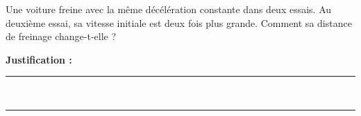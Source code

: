Une voiture freine avec la même décélération constante dans deux essais. Au deuxième essai, sa vitesse initiale est deux fois plus grande. Comment sa distance de freinage change-t-elle ?

\choices

\noindent\textbf{Justification :} \hrulefill \\[2.5ex]
\rule{\linewidth}{0.4pt} \\[2.5ex]
\rule{\linewidth}{0.4pt}
\vfill
